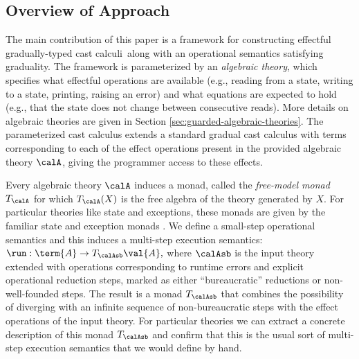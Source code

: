 \documentclass[acmsmall,screen,review,anonymous]{acmart}
\theoremstyle{remark}
\begin{document}


\subsection{Overview of Approach}\label{sec:overview-of-approach}

The main contribution of this paper is a framework for constructing effectful
gradually-typed cast calculi\footnotemark~along with an operational semantics
satisfying graduality. 
%
The framework is parameterized by an \emph{algebraic theory}, which
specifies what effectful operations are available (e.g., reading from a
state, writing to a state, printing, raising an error) and what
equations are expected to hold (e.g., that the state does not change
between consecutive reads). More details on algebraic theories are
given in Section \ref{sec:guarded-algebraic-theories}. The parameterized cast
calculus extends a standard gradual cast calculus with terms
corresponding to each of the effect operations present in the provided
algebraic theory $\calA$, giving the programmer access to these
effects.

Every algebraic theory $\calA$ induces a monad, called the
\emph{free-model monad} $T_\calA$ for which $T_\calA(X)$ is the free
algebra of the theory generated by $X$. For particular theories like
state and exceptions, these monads are given by the familiar state and
exception monads \cite{monads-and-effects}. We define a small-step
operational semantics and this induces a multi-step execution
semantics:
%
$\run : \term{A} \to T_{\calAsb}\val{A},$
%
where $\calAsb$ is the input theory extended with operations
corresponding to runtime errors and explicit operational reduction steps, marked as
either ``bureaucratic'' reductions or non-well-founded steps. The result is
a monad $T_{\calAsb}$ that combines the possibility of
diverging with an infinite sequence of non-bureaucratic steps with the
effect operations of the input theory. For particular theories we can
extract a concrete description of this monad $T_{\calAsb}$ and confirm
that this is the usual sort of multi-step execution semantics that we
would define by hand.
\end{document}
